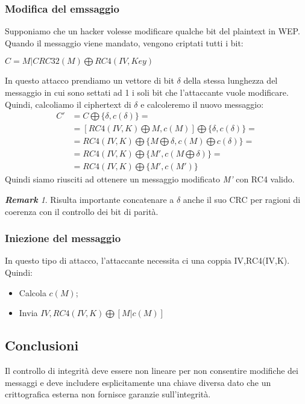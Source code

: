 \documentclass{article}
\theoremstyle{remark}
\newtheorem*{remark}{\textbf{Remark}}
\begin{document}
\subsubsection{Modifica del emssaggio}
Supponiamo che un hacker volesse modificare qualche bit del plaintext in WEP.\newline
Quando il messaggio viene mandato, vengono criptati tutti i bit:
\begin{center}
	$C=M|CRC32(M)\bigoplus RC4(IV,Key)$
\end{center}
In questo attacco prendiamo un vettore di bit $\delta$ della stessa lunghezza del messaggio in cui sono settati ad 1 i soli bit che l'attaccante vuole modificare. Quindi, calcoliamo il ciphertext di $\delta$ e calcoleremo il nuovo messaggio:
\begin{align*}
	C' & =C\bigoplus \{ \delta,c(\delta)\}=                                \\
	   & =[RC4(IV,K)\bigoplus {M,c(M)}]\bigoplus \{\delta,c(\delta)\}=     \\
	   & =RC4(IV,K)\bigoplus \{M\bigoplus\delta,c(M)\bigoplus c(\delta)\}= \\
	   & =RC4(IV,K)\bigoplus \{M',c(M\bigoplus \delta)\}=                  \\
	   & =RC4(IV,K)\bigoplus \{M',c(M')\}
\end{align*}
Quindi siamo riusciti ad ottenere un messaggio modificato \emph{M'} con RC4 valido.
\begin{remark}
	Risulta importante concatenare a $\delta$ anche il suo CRC per ragioni di coerenza con il controllo dei bit di parità.
\end{remark}
\subsubsection{Iniezione del messaggio}
In questo tipo di attacco, l'attaccante necessita ci una coppia IV,RC4(IV,K). Quindi:
\begin{itemize}
	\item Calcola $c(M)$;
	\item Invia $IV,RC4(IV,K)\bigoplus [M|c(M)]$
\end{itemize}
\subsection{Conclusioni}
Il controllo di integrità deve essere non lineare per non consentire modifiche dei messaggi e deve includere esplicitamente una chiave diversa dato che un crittografica esterna non fornisce garanzie sull'integrità.
\end{document}

